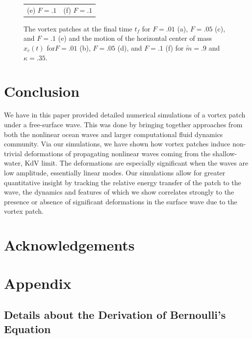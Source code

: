 \documentclass[a4paper,11pt]{article}
\begin{document}
\begin{figure}
\begin{tabular}{cc}
(e) $F=.1$ & (f) $F=.1$
\end{tabular}
\caption{The vortex patches at the final time $t_{f}$ for $F=.01$ (a), $F=.05$ (c), and $F=.1$ (e) and the motion of the horizontal center of mass $x_{c}(t)$ for$F=.01$ (b), $F=.05$ (d), and $F=.1$ (f) for $\tilde{m}=.9$ and $\kappa = .35$.}
\label{fig:highsolvorticity}
\end{figure}


\section{Conclusion}
We have in this paper provided detailed numerical simulations of a vortex patch under a free-surface wave.  This was done by bringing together approaches from both the nonlinear ocean waves and larger computational fluid dynamics community.  Via our simulations, we have shown how vortex patches induce non-trivial deformations of propagating nonlinear waves coming from the shallow-water, KdV limit.  The deformations are especially significant when the waves are low amplitude, essentially linear modes.  Our simulations allow for greater quantitative insight by tracking the relative energy transfer of the patch to the wave, the dynamics and features of which we show correlates strongly to the presence or absence of significant deformations in the surface wave due to the vortex patch.  

\section*{Acknowledgements}

\section*{Appendix}

\subsection*{Details about the Derivation of Bernoulli's Equation}
\end{document}
